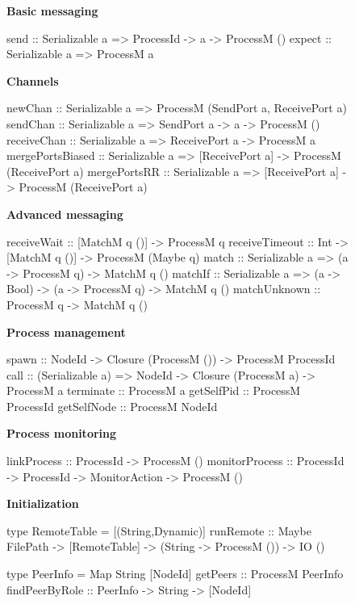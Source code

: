 \documentclass[preprint]{sigplanconf}
\begin{document}
\begin{figure}[t!]
\small
\renewcommand{\baselinestretch}{0}
\textbf{Basic messaging} 
\begin{code}
send   :: Serializable a => ProcessId -> a
       -> ProcessM ()
expect :: Serializable a => ProcessM a
\end{code}
 \textbf{Channels}
\begin{code}
newChan  :: Serializable a 
         => ProcessM (SendPort a, ReceivePort a)
sendChan :: Serializable a 
         => SendPort a -> a -> ProcessM ()
receiveChan :: Serializable a => ReceivePort a
            -> ProcessM a
mergePortsBiased :: Serializable a => [ReceivePort a]
                 -> ProcessM (ReceivePort a)
mergePortsRR :: Serializable a => [ReceivePort a] 
             -> ProcessM (ReceivePort a)
\end{code}

 \textbf{Advanced messaging}
\begin{code}
receiveWait    :: [MatchM q ()] -> ProcessM q
receiveTimeout :: Int -> [MatchM q ()] 
               -> ProcessM (Maybe q)
match   :: Serializable a => (a -> ProcessM q) 
        -> MatchM q ()
matchIf :: Serializable a => (a -> Bool) 
        -> (a -> ProcessM q) -> MatchM q ()
matchUnknown :: ProcessM q -> MatchM q ()
\end{code}

 \textbf{Process management}
\begin{code}
spawn :: NodeId -> Closure (ProcessM ()) 
      -> ProcessM ProcessId
call :: (Serializable a) => NodeId -> 
        Closure (ProcessM a) -> ProcessM a
terminate :: ProcessM a
getSelfPid :: ProcessM ProcessId
getSelfNode :: ProcessM NodeId
\end{code}

 \textbf{Process monitoring}
\begin{code}
linkProcess :: ProcessId -> ProcessM ()
monitorProcess :: ProcessId -> ProcessId 
               -> MonitorAction -> ProcessM ()
\end{code}

 \textbf{Initialization}
\begin{code}
type RemoteTable = [(String,Dynamic)]
runRemote      :: Maybe FilePath -> [RemoteTable] 
               -> (String -> ProcessM ()) -> IO ()

type PeerInfo = Map String [NodeId]
getPeers       :: ProcessM PeerInfo
findPeerByRole :: PeerInfo -> String -> [NodeId]
\end{code}


\end{figure}
\end{document}
